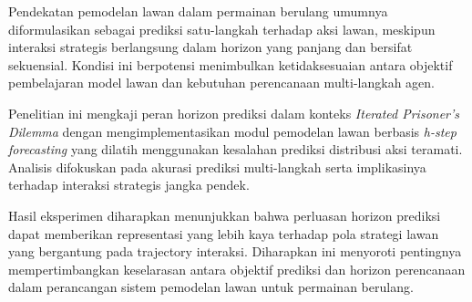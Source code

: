 \abstractind
Pendekatan pemodelan lawan dalam permainan berulang umumnya diformulasikan sebagai prediksi satu-langkah terhadap aksi lawan, meskipun interaksi strategis berlangsung dalam horizon yang panjang dan bersifat sekuensial. Kondisi ini berpotensi menimbulkan ketidaksesuaian antara objektif pembelajaran model lawan dan kebutuhan perencanaan multi-langkah agen.

Penelitian ini mengkaji peran horizon prediksi dalam konteks \textit{Iterated Prisoner's Dilemma} dengan mengimplementasikan modul pemodelan lawan berbasis \textit{h-step forecasting} yang dilatih menggunakan kesalahan prediksi distribusi aksi teramati. Analisis difokuskan pada akurasi prediksi multi-langkah serta implikasinya terhadap interaksi strategis jangka pendek.

Hasil eksperimen diharapkan menunjukkan bahwa perluasan horizon prediksi dapat memberikan representasi yang lebih kaya terhadap pola strategi lawan yang bergantung pada trajectory interaksi. Diharapkan ini menyoroti pentingnya mempertimbangkan keselarasan antara objektif prediksi dan horizon perencanaan dalam perancangan sistem pemodelan lawan untuk permainan berulang.
\endabstractind